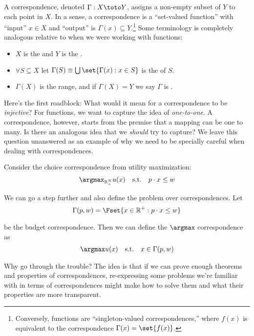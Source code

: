 \documentclass{article}
\begin{document}
A correspondence, denoted $\Gamma: X \toto Y$, assigns a non-empty subset of $Y$ to each point in $X$. In a sense, a correspondence is a ``set-valued function'' with ``input'' $x \in X$ and ``output'' is $\Gamma(x) \subseteq Y$.\footnote{Conversely, functions are ``singleton-valued correspondences,'' where $f(x)$ is equivalent to the correspondence $\Gamma(x) = \set{f(x)}$.} Some terminology is completely analogous relative to when we were working with functions:
\begin{itemize}[label=$\bullet$]
  \item $X$ is the  and $Y$ is the .

  \item $\forall S \subseteq X$ let $\Gamma(S) \equiv \bigcup\set{\Gamma(x): x \in S}$ is the  of $S$.

  \item $\Gamma(X)$ is the range, and if $\Gamma(X) = Y$ we say $\Gamma$ is .
\end{itemize}

Here's the first roadblock: What would it mean for a correspondence to be \textit{injective}? For functions, we want to capture the idea of \textit{one-to-one}. A correspondence, however, starts from the premise that a mapping can be one to many. Is there an analogous idea that we \textit{should} try to capture? We leave this question unanswered as an example of why we need to be specially careful when dealing with correspondences.
\begin{example}
  Consider the choice correspondence from utility maximization:
  \begin{align*}
    \argmax_{\mathbb{R}^N_+} u(x)
    \quad
    \text{s.t.}
    \quad
    p \cdot x \le w
  \end{align*}

  We can go a step further and also define the problem over correspondences. Let
  \begin{align*}
    \Gamma(p, w)
    =
    \Fset{x \in \mathbb{R}^+: p \cdot x \le w}
  \end{align*}

  be the budget correspondence. Then we can define the $\argmax$ correspondence as
  \begin{align*}
    \argmax u(x)
    \quad
    \text{s.t.}
    \quad
    x \in \Gamma(p, w)
  \end{align*}

  Why go through the trouble? The idea is that if we can prove enough theorems and properties of correspondences, re-expressing some problems we're familiar with in terms of correspondences might make how to solve them and what their properties are more transparent.
\end{example}
\end{document}
